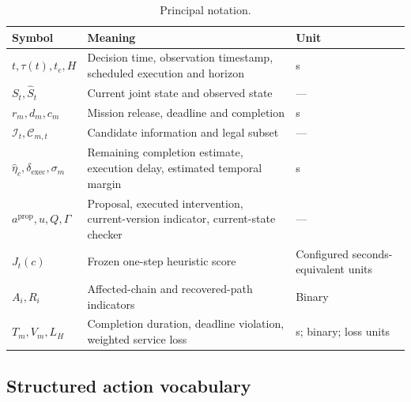 \documentclass[11pt,a4paper]{article}
\begin{document}
\begin{table}[H]
\centering
\small
\setlength{\tabcolsep}{3pt}
\caption{Principal notation.}
\label{tab:S8}
\begin{tabularx}{\textwidth}{@{}lYY@{}}
\toprule
Symbol & Meaning & Unit \\
\midrule
$t,\tau(t),t_e,H$ & Decision time, observation timestamp, scheduled execution and horizon & s \\
$S_t,\widehat S_t$ & Current joint state and observed state & --- \\
$r_m,d_m,c_m$ & Mission release, deadline and completion & s \\
$\mathcal I_t,\mathcal C_{m,t}$ & Candidate information and legal subset & --- \\
$\widehat\eta_c,\delta_{\mathrm{exec}},\sigma_m$ & Remaining completion estimate, execution delay, estimated temporal margin & s \\
$a^{\mathrm{prop}},u,Q,\Gamma$ & Proposal, executed intervention, current-version indicator, current-state checker & --- \\
$J_t(c)$ & Frozen one-step heuristic score & Configured seconds-equivalent units \\
$A_i,R_i$ & Affected-chain and recovered-path indicators & Binary \\
$T_m,V_m,L_H$ & Completion duration, deadline violation, weighted service loss & s; binary; loss units \\
\bottomrule
\end{tabularx}
\end{table}

\subsection{Structured action vocabulary}
\end{document}

